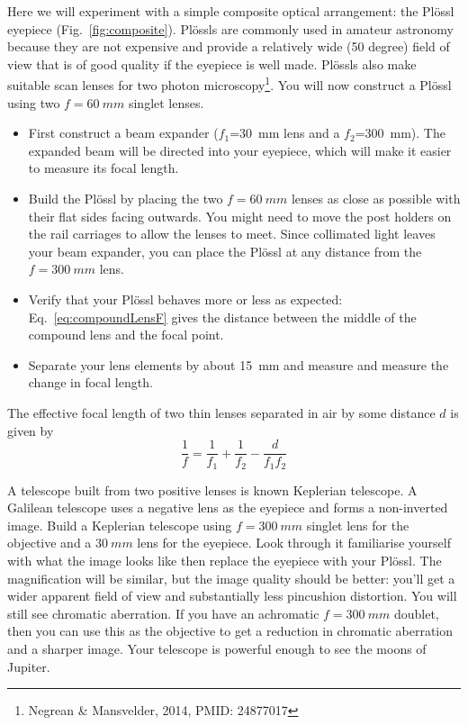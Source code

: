 \documentclass[a4paper]{report}
\begin{document}
Here we will experiment with a simple composite optical arrangement: the Pl\"{o}ssl eyepiece (Fig.~\ref{fig:composite}). 
Pl\"{o}ssls are commonly used in amateur astronomy because they are not expensive and provide a relatively wide (50 degree) field of view that is of good 
quality if the eyepiece is well made. 
Pl\"{o}ssls also make suitable scan lenses for two photon microscopy\footnote{Negrean \& Mansvelder, 2014, PMID: 24877017}.
You will now construct a Pl\"{o}ssl using two $f=60~mm$ singlet lenses.


\begin{itemize}
\item First construct a beam expander ($f_1$=30~mm lens and a $f_2$=300~mm). 
The expanded beam will be directed into your eyepiece, which will make it easier to measure its focal length.
\item Build the Pl\"ossl by placing the two $f=60~mm$ lenses as close as possible with their flat sides facing outwards. 
You might need to move the post holders on the rail carriages to allow the lenses to meet.
Since collimated light leaves your beam expander, you can place the Pl\"ossl at any distance from the $f=300~mm$ lens. 
\item Verify that your Pl\"{o}ssl behaves more or less as expected: 
Eq.~\ref{eq:compoundLensF} gives the distance between the middle of the compound lens and the focal point. 
\item Separate your lens elements by about 15~mm and measure and measure the change in focal length.
\end{itemize}

The effective focal length of two thin lenses separated in air by some distance $d$ is given by
\begin{equation}
\frac{1}{f} = \frac{1}{f_1} + \frac{1}{f_2} - \frac{d}{f_1f_2}
\label{eq:compoundLensF}
\end{equation}

A telescope built from two positive lenses is known Keplerian telescope. 
A Galilean telescope uses a negative lens as the eyepiece and forms a non-inverted image.
Build a Keplerian telescope using $f=300~mm$ singlet lens for the objective and a $30~mm$ lens for the eyepiece. 
Look through it familiarise yourself with what the image looks like then replace the eyepiece with your Pl\"{o}ssl. 
The magnification will be similar, but the image quality should be better: you'll get a wider apparent field of view and substantially less pincushion distortion. 
You will still see chromatic aberration. 
If you have an achromatic $f=300~mm$ doublet, then you can use this as the objective to get a reduction in chromatic aberration and a sharper image. 
Your telescope is powerful enough to see the moons of Jupiter. 
\end{document}
